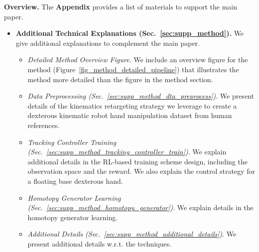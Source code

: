





\noindent\textbf{Overview.} 
The \textbf{Appendix} provides a list of materials to support the main paper. 
\begin{itemize}
    \item \textbf{Additional Technical Explanations (Sec.~\ref{sec:supp_method}).} We give additional explanations to complement the main paper. 
    \begin{itemize}
        \item  \textcolor{myblue}{\textit{Detailed Method Overview Figure}.} \textcolor{myblue}{We include an overview figure for the method (Figure~\ref{fig_method_detailed_pipeline}) that illustrates the method more detailed than the figure in the method section.}
        \item \textit{Data Preprocessing (Sec.~\ref{sec:supp_method_dta_preprocess})}.  We present details of the kinematics retargeting strategy we leverage to create a dexterous kinematic robot hand manipulation dataset from human references. 
        \item \textit{Tracking Controller Training (Sec.~\ref{sec:supp_method_tracking_controller_train})}. We explain additional details in the RL-based training scheme design, including the observation space and the reward. We also explain the control strategy for a floating base dexterous hand.  
        \item \textit{Homotopy Generator Learning (Sec.~\ref{sec:supp_method_homotopy_generator})}. We explain details in the homotopy generator learning.
        \item  \textit{Additional Details (Sec.~\ref{sec:supp_method_additional_details})}. We present additional details w.r.t. the techniques. 

\end{itemize}
\end{itemize}
